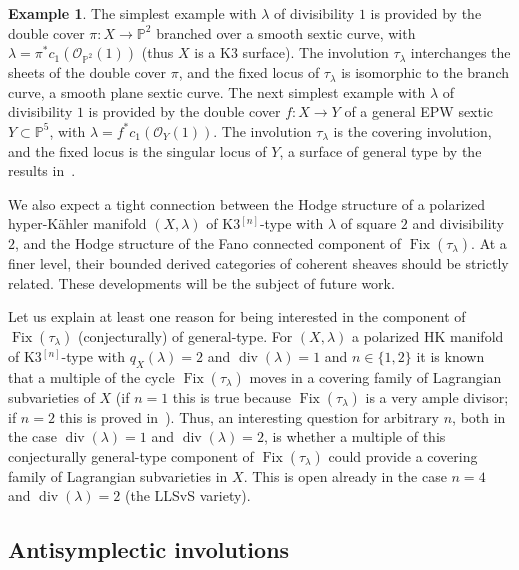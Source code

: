 \documentclass[JEP,XML,SOM,Unicode,published]{cedram}
\newcommand{\HK}{\textup{HK}\xspace}
\newcommand{\PP}{{\mathbb P}}\let\P\PP
\newcommand\cO{\mathcal{O}}
\DeclareMathOperator{\divisore}{div}\let\div\divisore
\DeclareMathOperator{\Fix}{Fix}
\theoremstyle{definition}
\newtheorem{exam}[lemm]{Example}
\begin{document}
\begin{exam}\label{ex:divuno}
The simplest example with $\lambda$ of divisibility $1$ is provided by the double cover $\pi\colon X\to\PP^2$ branched over a smooth sextic curve, with $\lambda=\pi^{*}c_1(\cO_{\PP^2}(1))$ (thus $X$ is a K3 surface). The involution $\tau_\lambda$ interchanges the sheets of the double cover $\pi$, and the fixed locus of $\tau_\lambda$ is isomorphic to the branch curve, \ie a smooth plane sextic curve. The next simplest example
with $\lambda$ of divisibility $1$ is provided by the double cover $f\colon X\to Y$ of a general EPW sextic $Y\subset \PP^5$, with $\lambda=f^{*}c_1(\cO_{Y}(1))$. The involution $\tau_\lambda$ is the covering involution, and the fixed locus is the singular locus of $Y$, a surface
of general type by the results in~\cite{Kieran:numhilb2}.
\end{exam}

We also expect a tight connection between the Hodge structure of a polarized hyper-Kähler manifold $(X,\lambda)$
of K3$^{[n]}$-type
with $\lambda$ of square $2$ and divisibility $2$, and the Hodge structure of the Fano connected component of
$\Fix(\tau_{\lambda})$. At a finer level, their bounded derived categories of coherent sheaves should be strictly related. These developments will be the subject of future work.

Let us explain at least one reason for being interested in the component of $\Fix(\tau_{\lambda})$ (conjecturally) of general-type. For $(X,\lambda)$ a polarized \HK manifold of K3$^{[n]}$-type with $q_X(\lambda)=2$ and $\divisore(\lambda)=1$ and $n\in\{1,2\}$ it is known that a multiple of the cycle $\Fix(\tau_{\lambda})$ moves in a covering family of Lagrangian subvarieties of $X$ (if $n=1$ this is true because $\Fix(\tau_{\lambda})$ is a very ample divisor; if $n=2$ this is proved in~\cite{Ferretti:thesis,Kieran:LagrangianCovering}). Thus,
an interesting question for arbitrary $n$, both in the case $\divisore(\lambda)=1$ and \hbox{$\divisore(\lambda)=2$}, is whether a multiple of this conjecturally general-type component of $\Fix(\tau_{\lambda})$ could provide a
covering family of Lagrangian subvarieties in $X$.
This is open already in the case $n=4$ and $\divisore(\lambda)=2$ (the LLSvS variety).

\subsection{Antisymplectic involutions}\label{subsec:AntisymplecticIntro}
\end{document}
